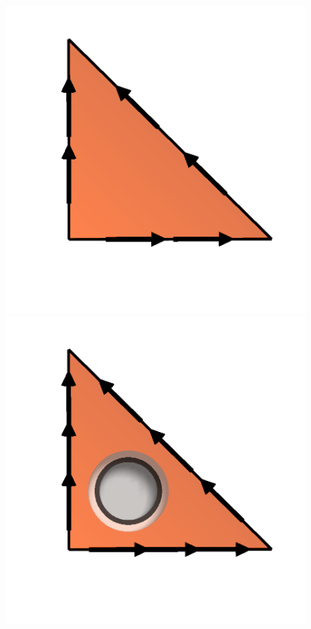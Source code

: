 \begin{figure}
  \centering
  \includegraphics[width=\threefigs]{chapters/kirby-6/png/NED2_1_2d.png}
  \includegraphics[width=\threefigs]{chapters/kirby-6/png/NED2_2_2d.png}

\end{figure}
